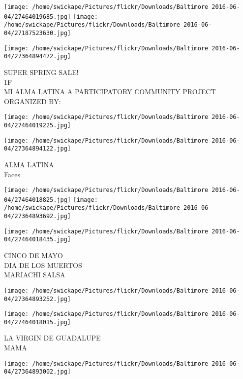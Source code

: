 \documentclass[10pt,letterpaper]{article}
\begin{document}
\texttt{[image: /home/swickape/Pictures/flickr/Downloads/Baltimore 2016-06-04/27464019685.jpg]}
\texttt{[image: /home/swickape/Pictures/flickr/Downloads/Baltimore 2016-06-04/27187523630.jpg]}

\texttt{[image: /home/swickape/Pictures/flickr/Downloads/Baltimore 2016-06-04/27364894472.jpg]}

SUPER SPRING SALE!\\
1F\\
MI ALMA LATINA A PARTICIPATORY COMMUNITY PROJECT ORGANIZED BY:\\
\pagebreak

\texttt{[image: /home/swickape/Pictures/flickr/Downloads/Baltimore 2016-06-04/27464019225.jpg]}

\vspace{0.25in}
\texttt{[image: /home/swickape/Pictures/flickr/Downloads/Baltimore 2016-06-04/27364894122.jpg]}

ALMA LATINA\\
Faces\\
\pagebreak

\texttt{[image: /home/swickape/Pictures/flickr/Downloads/Baltimore 2016-06-04/27464018825.jpg]}
\texttt{[image: /home/swickape/Pictures/flickr/Downloads/Baltimore 2016-06-04/27364893692.jpg]}

\vspace{0.25in}
\texttt{[image: /home/swickape/Pictures/flickr/Downloads/Baltimore 2016-06-04/27464018435.jpg]}

CINCO DE MAYO\\
DIA DE LOS MUERTOS\\
MARIACHI SALSA\\
\pagebreak

\texttt{[image: /home/swickape/Pictures/flickr/Downloads/Baltimore 2016-06-04/27364893252.jpg]}

\vspace{0.25in}
\texttt{[image: /home/swickape/Pictures/flickr/Downloads/Baltimore 2016-06-04/27464018015.jpg]}

LA VIRGIN DE GUADALUPE\\
MAMA\\
\pagebreak

\texttt{[image: /home/swickape/Pictures/flickr/Downloads/Baltimore 2016-06-04/27364893002.jpg]}
\end{document}
